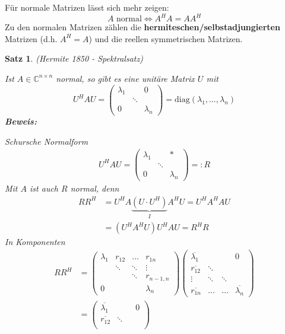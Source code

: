 \documentclass[%
a4paper,
11pt,		%
leqno,		%
]
{scrartcl}
\newcommand{\C}{\mathbb{C}}
\theoremstyle{plain}
\theoremstyle{plain}
\newtheorem{mysatz}[mydef]{Satz}
\theoremstyle{plain}
\theoremstyle{plain}
\begin{document}
Für normale Matrizen lässt sich mehr zeigen:
\[
A \text{ normal} \Leftrightarrow A^HA = AA^H
\]
Zu den normalen Matrizen zählen die \textbf{hermiteschen/selbstadjungierten} Matrizen (d.h. $A^H = A$) und die reellen symmetrischen Matrizen.

\begin{mysatz}
(Hermite 1850 - \textit{Spektralsatz})

Ist $A \in \C^{n \times n}$ normal, so gibt es eine unitäre Matrix $U$ mit
\[
U^H A U = 
\begin{pmatrix}
\lambda_1 & & 0\\
& \ddots & \\
0 & & \lambda_n
\end{pmatrix}
=
\text{diag}(\lambda_1,\dots,\lambda_n)
\]
\textbf{Beweis:}

Schursche Normalform
\begin{align*}
U^H A U = 
\begin{pmatrix}
\lambda_1 & & *\\
& \ddots & \\
0 & & \lambda_n
\end{pmatrix}
=: R
\end{align*}
Mit $A$ ist auch $R$ normal, denn
\begin{align*}
RR^H & = U^H A \underbrace{(U \cdot U^H)}_{I} A^H U = U^H A^H A U\\
 & = (U^H A^H U) U^H A U  = R^H R
\end{align*}
In Komponenten
\begin{align*}
R R^H & = 
\begin{pmatrix}
\lambda_1   & r_{12}    & \dots     & r_{1n}\\
            & \ddots    & \ddots    & \vdots\\
            &           & \ddots    & r_{n-1,n}\\
0           &           &           & \lambda_n
\end{pmatrix}
\begin{pmatrix}
\overline{\lambda_1}    & & & 0\\
\overline{r_{12}}       & \ddots\\
\vdots                  & \ddots & \ddots\\
\overline{r_{1n}}       & \dots & \dots & \overline{\lambda_n}
\end{pmatrix}\\
& = 
\begin{pmatrix}
\overline{\lambda_1}    & & & 0\\
\overline{r_{12}}       & \ddots\\

\end{pmatrix}
\end{align*}
\end{mysatz}
\end{document}
